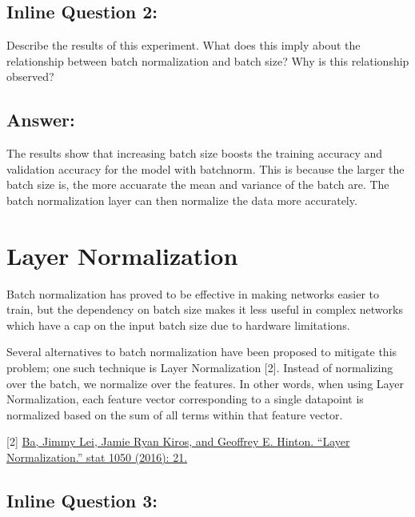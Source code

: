 \documentclass[11pt]{article}
\begin{document}
    \hypertarget{inline-question-2}{%
\subsection{Inline Question 2:}\label{inline-question-2}}

Describe the results of this experiment. What does this imply about the
relationship between batch normalization and batch size? Why is this
relationship observed?

\hypertarget{answer}{%
\subsection{Answer:}\label{answer}}

The results show that increasing batch size boosts the training accuracy
and validation accuracy for the model with batchnorm. This is because
the larger the batch size is, the more accuarate the mean and variance
of the batch are. The batch normalization layer can then normalize the
data more accurately.

    \hypertarget{layer-normalization}{%
\section{Layer Normalization}\label{layer-normalization}}

Batch normalization has proved to be effective in making networks easier
to train, but the dependency on batch size makes it less useful in
complex networks which have a cap on the input batch size due to
hardware limitations.

Several alternatives to batch normalization have been proposed to
mitigate this problem; one such technique is Layer Normalization
{[}2{]}. Instead of normalizing over the batch, we normalize over the
features. In other words, when using Layer Normalization, each feature
vector corresponding to a single datapoint is normalized based on the
sum of all terms within that feature vector.

{[}2{]} \href{https://arxiv.org/pdf/1607.06450.pdf}{Ba, Jimmy Lei, Jamie
Ryan Kiros, and Geoffrey E. Hinton. ``Layer Normalization.'' stat 1050
(2016): 21.}

    \hypertarget{inline-question-3}{%
\subsection{Inline Question 3:}\label{inline-question-3}}
\end{document}
